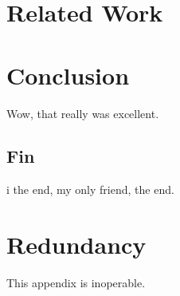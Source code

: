 \documentclass[onehalf,11pt]{beavtex}
\begin{document}
\chapter{Related Work}


\chapter{Conclusion}
Wow, that really was excellent.
\section{Fin}
i the end, my only friend, the end.







\appendix
\chapter{Redundancy}
This appendix is inoperable.
\end{document}
